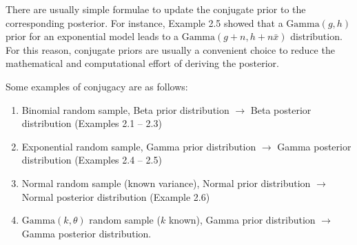 There are usually simple formulae to update the conjugate prior to the corresponding posterior.
For instance, Example 2.5 showed that a $\text{Gamma}(g,h)$ prior for an exponential model
leads to a $\text{Gamma}(g+n,h+n\bar x)$ distribution.
For this reason, conjugate priors are usually a convenient choice to reduce the mathematical and computational effort of deriving the posterior.

Some examples of conjugacy are as follows:
\begin{enumerate}
\item Binomial random sample, Beta prior distribution
$\longrightarrow$ Beta posterior distribution (Examples 2.1 -- 2.3)
\item Exponential random sample, Gamma prior distribution
$\longrightarrow$ Gamma posterior distribution (Examples 2.4 -- 2.5)
\item Normal random sample (known variance), Normal prior distribution
$\longrightarrow$ Normal posterior distribution (Example 2.6)
\item $\text{Gamma}(k,\theta)$ random sample ($k$ known), Gamma prior distribution
$\longrightarrow$ Gamma posterior distribution.
\end{enumerate}

